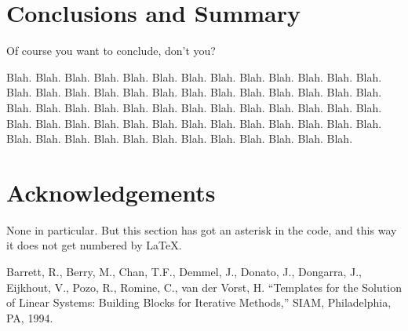 \documentclass[a4paper,twoside]{arlims}
\begin{document}
\section{Conclusions and Summary}
\label{sec:conclusions}

Of course you want to conclude, don't you? 

Blah. Blah. Blah. Blah. Blah. Blah. Blah. Blah. Blah. Blah. Blah.
Blah. Blah. Blah. Blah. Blah. Blah. Blah. Blah. Blah. Blah. Blah.
Blah. Blah. Blah. Blah. Blah. Blah. Blah. Blah. Blah. Blah. Blah.
Blah. Blah. Blah. Blah. Blah. Blah. Blah. Blah. Blah. Blah. Blah.
Blah. Blah. Blah. Blah. Blah. Blah. Blah. Blah. Blah. Blah. Blah.
Blah. Blah. Blah. Blah. Blah. Blah. Blah. Blah. Blah.


\section*{Acknowledgements}
None in particular. But this section has got an asterisk in the
code, and this way it does not get numbered by \LaTeX.



\begin{thebibliography}{10}

  Barrett, R., Berry, M., Chan, T.F., Demmel, J., Donato, J.,
  Dongarra, J., Eijkhout, V., Pozo, R., Romine, C., van der Vorst, H.
  ``Templates for the Solution of Linear Systems: Building Blocks for
  Iterative Methods,'' SIAM, Philadelphia, PA, 1994.


\end{thebibliography}

\label{lastpagenum}
\end{document}
